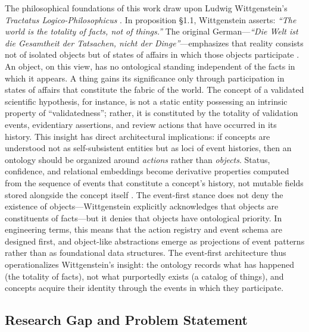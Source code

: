 The philosophical foundations of this work draw upon Ludwig Wittgenstein's \emph{Tractatus Logico-Philosophicus} \cite{ref9}. In proposition §1.1, Wittgenstein asserts: \emph{``The world is the totality of facts, not of things.''} The original German---\emph{``Die Welt ist die Gesamtheit der Tatsachen, nicht der Dinge''}---emphasizes that reality consists not of isolated objects but of states of affairs in which those objects participate \cite{ref10}. An object, on this view, has no ontological standing independent of the facts in which it appears. A thing gains its significance only through participation in states of affairs that constitute the fabric of the world. The concept of a validated scientific hypothesis, for instance, is not a static entity possessing an intrinsic property of ``validatedness''; rather, it is constituted by the totality of validation events, evidentiary assertions, and review actions that have occurred in its history. This insight has direct architectural implications: if concepts are understood not as self-subsistent entities but as loci of event histories, then an ontology should be organized around \emph{actions} rather than \emph{objects}. Status, confidence, and relational embeddings become derivative properties computed from the sequence of events that constitute a concept's history, not mutable fields stored alongside the concept itself \cite{ref11}\cite{ref12}. The event-first stance does not deny the existence of objects---Wittgenstein explicitly acknowledges that objects are constituents of facts---but it denies that objects have ontological priority. In engineering terms, this means that the action registry and event schema are designed first, and object-like abstractions emerge as projections of event patterns rather than as foundational data structures. The event-first architecture thus operationalizes Wittgenstein's insight: the ontology records what has happened (the totality of facts), not what purportedly exists (a catalog of things), and concepts acquire their identity through the events in which they participate.

\subsection{Research Gap and Problem Statement}\label{research-gap-and-problem-statement}

